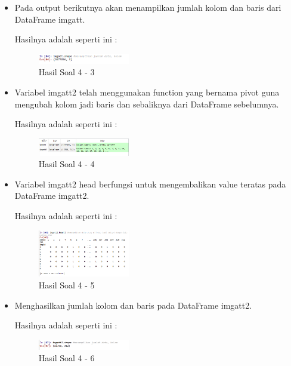 \begin{enumerate}
\begin{itemize}
	\item Pada output berikutnya akan menampilkan jumlah kolom dan baris dari DataFrame imgatt. 
	
	Hasilnya adalah seperti ini :

	\begin{figure}[H]
	\centering
		\includegraphics[width=4cm]{figures/1174096/tugas3/hasil43.PNG}
		\caption{Hasil Soal 4 - 3}
	\end{figure}

	\item Variabel imgatt2 telah menggunakan function yang bernama pivot guna mengubah kolom jadi baris dan sebaliknya dari DataFrame sebelumnya.
	
	Hasilnya adalah seperti ini :

	\begin{figure}[H]
	\centering
		\includegraphics[width=4cm]{figures/1174096/tugas3/hasil44.PNG}
		\caption{Hasil Soal 4 - 4}
	\end{figure}

	\item Variabel imgatt2 head berfungsi untuk mengembalikan value teratas pada DataFrame imgatt2.
	
	Hasilnya adalah seperti ini :

	\begin{figure}[H]
	\centering
		\includegraphics[width=4cm]{figures/1174096/tugas3/hasil45.PNG}
		\caption{Hasil Soal 4 - 5}
	\end{figure}

	\item Menghasilkan jumlah kolom dan baris pada DataFrame imgatt2.
	
	Hasilnya adalah seperti ini :

	\begin{figure}[H]
	\centering
		\includegraphics[width=4cm]{figures/1174096/tugas3/hasil46.PNG}
		\caption{Hasil Soal 4 - 6}
	\end{figure}


\end{itemize}
\end{enumerate}
